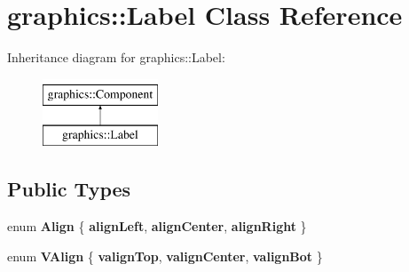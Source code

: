 \hypertarget{classgraphics_1_1_label}{\section{graphics\-:\-:Label Class Reference}
\label{classgraphics_1_1_label}
}
Inheritance diagram for graphics\-:\-:Label\-:\begin{figure}[H]
\begin{center}
\leavevmode
\includegraphics[height=2.000000cm]{classgraphics_1_1_label}
\end{center}
\end{figure}
\subsection*{Public Types}
\begin{DoxyCompactItemize}
\item 
enum {\bfseries Align} \{ {\bfseries align\-Left}, 
{\bfseries align\-Center}, 
{\bfseries align\-Right}
 \}
\item 
enum {\bfseries V\-Align} \{ {\bfseries valign\-Top}, 
{\bfseries valign\-Center}, 
{\bfseries valign\-Bot}
 \}
\end{DoxyCompactItemize}

